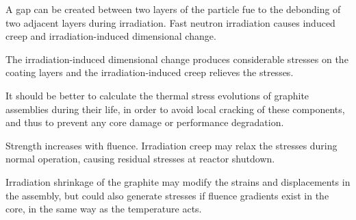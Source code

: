 A gap can be created between two layers of the particle fue to the debonding of two adjacent layers during irradiation.
Fast neutron irradiation causes induced creep and irradiation-induced dimensional change.

The irradiation-induced dimensional change produces considerable stresses on the coating layers and the irradiation-induced creep relieves the stresses.

\cite{cho_stress_2009}

It should be better to calculate the thermal stress evolutions of graphite assemblies during their life, in order to avoid local cracking of these components, and thus to prevent any core
damage or performance degradation.

Strength increases with fluence. Irradiation creep may relax the stresses during normal operation, causing residual stresses at reactor shutdown.

Irradiation shrinkage of the graphite may modify the strains and displacements in the assembly, but could also generate stresses if fluence gradients exist in the core, in the same way as the temperature acts.

\cite{lejeail_calculation_2005}
